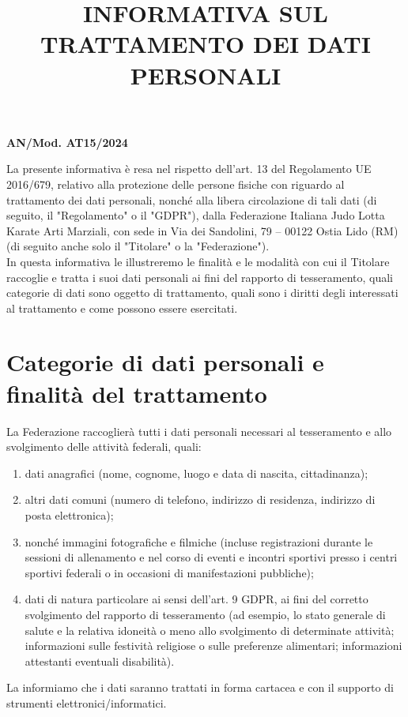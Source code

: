 \documentclass{djts}
\title{INFORMATIVA SUL TRATTAMENTO DEI DATI PERSONALI}
\makeatletter
\renewcommand{\maketitle}{%
	\begin{center}%
		\textbf{\large \@title}%
	\end{center}%
}
\makeatother
\begin{document}
	\begin{flushright}
		\textbf{AN/Mod. AT15/2024}
	\end{flushright}
	\vspace{0.1in}
	
	\maketitle
	
	La presente informativa è resa nel rispetto dell'art. 13 del Regolamento UE 2016/679, relativo alla protezione delle persone fisiche con riguardo al trattamento dei dati personali, nonché alla libera circolazione di tali dati (di seguito, il "Regolamento" o il "GDPR"), dalla Federazione Italiana Judo Lotta Karate Arti Marziali, con sede in Via dei Sandolini, 79 – 00122 Ostia Lido (RM) (di seguito anche solo il "Titolare" o la "Federazione"). \\
	In questa informativa le illustreremo le finalità e le modalità con cui il Titolare raccoglie e tratta i suoi dati personali ai fini del rapporto di tesseramento, quali categorie di dati sono oggetto di trattamento, quali sono i diritti degli interessati al trattamento e come possono essere esercitati.
	
	\section{Categorie di dati personali e finalità del trattamento}
	La Federazione raccoglierà tutti i dati personali necessari al tesseramento e allo svolgimento delle attività federali, quali:
	\begin{enumerate}[label=\alph{*}.]
		\item dati anagrafici (nome, cognome, luogo e data di nascita, cittadinanza);
		\item altri dati comuni (numero di telefono, indirizzo di residenza, indirizzo di posta elettronica);
		\item nonché immagini fotografiche e filmiche (incluse registrazioni durante le sessioni di allenamento e nel corso di eventi e incontri sportivi presso i centri sportivi federali o in occasioni di manifestazioni pubbliche);
		\item dati di natura particolare ai sensi dell'art. 9 GDPR, ai fini del corretto svolgimento del rapporto di tesseramento (ad esempio, lo stato generale di salute e la relativa idoneità o meno allo svolgimento di determinate attività; informazioni sulle festività religiose o sulle preferenze alimentari; informazioni attestanti eventuali disabilità).
	\end{enumerate}
	La informiamo che i dati saranno trattati in forma cartacea e con il supporto di strumenti elettronici/informatici.
	
\end{document}
